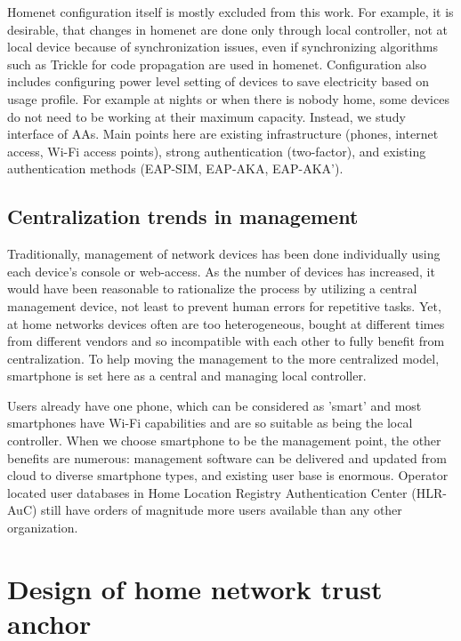 \documentclass[12pt,a4paper,english]{tutthesis}
\begin{document}
Homenet configuration itself is mostly excluded from this work.
For example, 
it is desirable, that changes in homenet are done only through
local controller, not at local device because of
synchronization issues, even 
if synchronizing algorithms such as Trickle  \cite{rfc6206}
for code propagation are used in homenet.
Configuration also includes configuring power level setting of devices to save electricity
based on usage profile. For example at nights or when there is nobody
home, some devices do not need to be working at their maximum
capacity. Instead, we study interface of AAs.
Main points here are existing infrastructure (phones, internet access, Wi-Fi
access points), strong authentication (two-factor), and existing
authentication methods (EAP-SIM, EAP-AKA, EAP-AKA').
\section{Centralization trends in management}
\label{sec-3-2}

Traditionally, management of network devices has been done
individually using each device's console or web-access.  As the number of
devices has increased, it would have been reasonable to rationalize
the process by utilizing a central management device, not least to prevent human
errors for repetitive tasks.  Yet, at home networks devices often are
too heterogeneous, bought at different times from different vendors
and so incompatible with each other to fully benefit from
centralization. To help moving the management to the more centralized
model, smartphone is set here as a central and managing local
controller.


Users already have one phone, which can be considered as
'smart' and most smartphones have Wi-Fi capabilities and are so
suitable as being the local controller.
When we choose smartphone to be the management point, the other benefits are
numerous:  management software can be delivered and
updated from cloud to diverse smartphone types, and existing user
base is enormous.
Operator located user databases in  
Home Location Registry Authentication Center (HLR-AuC) still have orders of
magnitude more users available than any other organization. 



\chapter{Design of home network trust anchor}
\label{sec-4}
\end{document}

